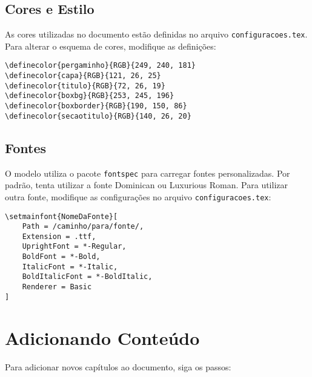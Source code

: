 \subsection{Cores e Estilo}

As cores utilizadas no documento estão definidas no arquivo \texttt{configuracoes.tex}. Para alterar o esquema de cores, modifique as definições:

\begin{quotebox}
\verb|\definecolor{pergaminho}{RGB}{249, 240, 181}|\\
\verb|\definecolor{capa}{RGB}{121, 26, 25}|\\
\verb|\definecolor{titulo}{RGB}{72, 26, 19}|\\
\verb|\definecolor{boxbg}{RGB}{253, 245, 196}|\\
\verb|\definecolor{boxborder}{RGB}{190, 150, 86}|\\
\verb|\definecolor{secaotitulo}{RGB}{140, 26, 20}|
\end{quotebox}

\subsection{Fontes}

O modelo utiliza o pacote \texttt{fontspec} para carregar fontes personalizadas. Por padrão, tenta utilizar a fonte Dominican ou Luxurious Roman. Para utilizar outra fonte, modifique as configurações no arquivo \texttt{configuracoes.tex}:

\begin{quotebox}
\verb|\setmainfont{NomeDaFonte}[|\\
\verb|    Path = /caminho/para/fonte/,|\\
\verb|    Extension = .ttf,|\\
\verb|    UprightFont = *-Regular,|\\
\verb|    BoldFont = *-Bold,|\\
\verb|    ItalicFont = *-Italic,|\\
\verb|    BoldItalicFont = *-BoldItalic,|\\
\verb|    Renderer = Basic|\\
\verb|]|
\end{quotebox}

\section{Adicionando Conteúdo}

Para adicionar novos capítulos ao documento, siga os passos:

